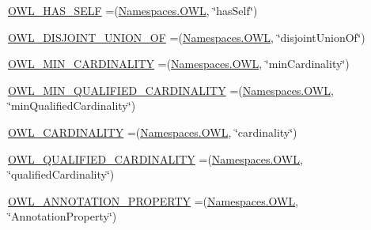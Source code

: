 \begin{DoxyCompactItemize}
\item 
\hyperlink{enumorg_1_1semanticweb_1_1owlapi_1_1vocab_1_1_o_w_l_r_d_f_vocabulary_ae42fc06d8e5d0c23ffa775cef4bbb6fb}{O\-W\-L\-\_\-\-H\-A\-S\-\_\-\-S\-E\-L\-F} =(\hyperlink{enumorg_1_1semanticweb_1_1owlapi_1_1vocab_1_1_namespaces_a2fcb537074d9307ef1356ffb6a5bd6f4}{Namespaces.\-O\-W\-L}, \char`\"{}has\-Self\char`\"{})
\item 
\hyperlink{enumorg_1_1semanticweb_1_1owlapi_1_1vocab_1_1_o_w_l_r_d_f_vocabulary_a8f4e4d287ee96ce6a59821adf3a4c606}{O\-W\-L\-\_\-\-D\-I\-S\-J\-O\-I\-N\-T\-\_\-\-U\-N\-I\-O\-N\-\_\-\-O\-F} =(\hyperlink{enumorg_1_1semanticweb_1_1owlapi_1_1vocab_1_1_namespaces_a2fcb537074d9307ef1356ffb6a5bd6f4}{Namespaces.\-O\-W\-L}, \char`\"{}disjoint\-Union\-Of\char`\"{})
\item 
\hyperlink{enumorg_1_1semanticweb_1_1owlapi_1_1vocab_1_1_o_w_l_r_d_f_vocabulary_a6bfbb586bfaef0efd755c36131ff055c}{O\-W\-L\-\_\-\-M\-I\-N\-\_\-\-C\-A\-R\-D\-I\-N\-A\-L\-I\-T\-Y} =(\hyperlink{enumorg_1_1semanticweb_1_1owlapi_1_1vocab_1_1_namespaces_a2fcb537074d9307ef1356ffb6a5bd6f4}{Namespaces.\-O\-W\-L}, \char`\"{}min\-Cardinality\char`\"{})
\item 
\hyperlink{enumorg_1_1semanticweb_1_1owlapi_1_1vocab_1_1_o_w_l_r_d_f_vocabulary_a2965ef2e698005817cdc7939e8eedaa5}{O\-W\-L\-\_\-\-M\-I\-N\-\_\-\-Q\-U\-A\-L\-I\-F\-I\-E\-D\-\_\-\-C\-A\-R\-D\-I\-N\-A\-L\-I\-T\-Y} =(\hyperlink{enumorg_1_1semanticweb_1_1owlapi_1_1vocab_1_1_namespaces_a2fcb537074d9307ef1356ffb6a5bd6f4}{Namespaces.\-O\-W\-L}, \char`\"{}min\-Qualified\-Cardinality\char`\"{})
\item 
\hyperlink{enumorg_1_1semanticweb_1_1owlapi_1_1vocab_1_1_o_w_l_r_d_f_vocabulary_ab08acdc830c050d85b57bf7086ee4041}{O\-W\-L\-\_\-\-C\-A\-R\-D\-I\-N\-A\-L\-I\-T\-Y} =(\hyperlink{enumorg_1_1semanticweb_1_1owlapi_1_1vocab_1_1_namespaces_a2fcb537074d9307ef1356ffb6a5bd6f4}{Namespaces.\-O\-W\-L}, \char`\"{}cardinality\char`\"{})
\item 
\hyperlink{enumorg_1_1semanticweb_1_1owlapi_1_1vocab_1_1_o_w_l_r_d_f_vocabulary_a2175e8ad3443c4f7ddb9ea5ef0e0e72f}{O\-W\-L\-\_\-\-Q\-U\-A\-L\-I\-F\-I\-E\-D\-\_\-\-C\-A\-R\-D\-I\-N\-A\-L\-I\-T\-Y} =(\hyperlink{enumorg_1_1semanticweb_1_1owlapi_1_1vocab_1_1_namespaces_a2fcb537074d9307ef1356ffb6a5bd6f4}{Namespaces.\-O\-W\-L}, \char`\"{}qualified\-Cardinality\char`\"{})
\item 
\hyperlink{enumorg_1_1semanticweb_1_1owlapi_1_1vocab_1_1_o_w_l_r_d_f_vocabulary_a9f723068881d9a0700efc7fd153fad8f}{O\-W\-L\-\_\-\-A\-N\-N\-O\-T\-A\-T\-I\-O\-N\-\_\-\-P\-R\-O\-P\-E\-R\-T\-Y} =(\hyperlink{enumorg_1_1semanticweb_1_1owlapi_1_1vocab_1_1_namespaces_a2fcb537074d9307ef1356ffb6a5bd6f4}{Namespaces.\-O\-W\-L}, \char`\"{}Annotation\-Property\char`\"{})

\end{DoxyCompactItemize}
